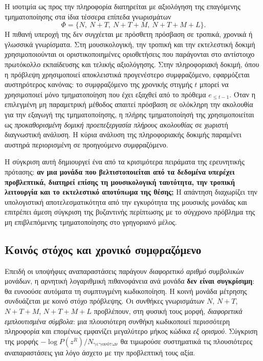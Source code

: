 \documentclass[11pt,a4paper]{article}
\begin{document}
Η ισοτιμία ως προς την πληροφορία διατηρείται με αξιολόγηση της επαγόμενης τμηματοποίησης στα ίδια τέσσερα επίπεδα γνωρισμάτων
\[
\Phi=\{N,\ N{+}T,\ N{+}T{+}M,\ N{+}T{+}M{+}L\}.
\]
Η πιθανή υπεροχή της δεν συγχέεται με πρόσθετη πρόσβαση σε τροπικά, χρονικά ή γλωσσικά γνωρίσματα. Στη μουσικολογική, την τροπική και την εκτελεστική δοκιμή χρησιμοποιούνται οι οριστικοποιημένες οριοθετήσεις που παράγονται στο αντίστοιχο πρωτόκολλο εκπαίδευσης και τελικής αξιολόγησης. Στην πληροφοριακή δοκιμή, όπου η πρόβλεψη χρησιμοποιεί αποκλειστικά προγενέστερο συμφραζόμενο, εφαρμόζεται αυστηρότερος κανόνας: το συμφραζόμενο της χρονικής στιγμής \(t\) μπορεί να χρησιμοποιεί μόνο τμηματοποίηση που έχει εξαχθεί από το πρόθεμα \(e_{\leq t-1}\). Όταν η επιλεγμένη μη παραμετρική μέθοδος απαιτεί πρόσβαση σε ολόκληρη την ακολουθία για την εξαγωγή της τμηματοποίησης, η πλήρης τμηματοποίησή της χρησιμοποιείται ως \emph{προκαθορισμένη δομική προεπεξεργασία πλήρους ακολουθίας} σε χωριστή διαγνωστική ανάλυση. Η κύρια ανάλυση της πληροφοριακής δοκιμής παραμένει αυστηρά περιορισμένη σε προηγούμενο συμφραζόμενο.

Η σύγκριση αυτή δημιουργεί ένα από τα κρισιμότερα πειράματα της ερευνητικής πρότασης: \textbf{αν μια μονάδα που βελτιστοποιείται από τα δεδομένα υπερέχει προβλεπτικά, διατηρεί επίσης τη μουσικολογική ταυτότητα, την τροπική λειτουργία και το εκτελεστικό αποτύπωμα της θέσης;} Η απάντηση διαχωρίζει την υπολογιστική αποτελεσματικότητα από την εγκυρότητα της μουσικής μονάδας και επιτρέπει άμεση σύγκριση της βυζαντινής περίπτωσης με το σύγχρονο πρόβλημα της μη επιβλεπόμενης τμηματοποίησης στο γρηγοριανό μέλος.

\subsection{Κοινός στόχος και χρονικό συμφραζόμενο}\label{app:repr-common-target}

Επειδή οι υποψήφιες αναπαραστάσεις παράγουν \emph{διαφορετικό αριθμό} συμβολικών μονάδων, η αρνητική λογαριθμική πιθανοφάνεια ανά μονάδα \textbf{δεν είναι συγκρίσιμη}: θα ευνοούσε αυτόματα τη συμπτυγμένη κωδικοποίηση. Η κοινή μονάδα μέτρησης συνδυάζεται με κοινό στόχο πρόβλεψης. Οι συνθήκες γνωρισμάτων \(N\), \(N{+}T\), \(N{+}T{+}M\), \(N{+}T{+}M{+}L\) προβλέπουν, στη φυσική τους μορφή, \emph{διαφορετικά εμπλουτισμένα σύμβολα}: μια πλουσιότερη συνθήκη κωδικοποιεί περισσότερη πληροφορία και επομένως εμφανίζει μεγαλύτερο μήκος κώδικα \emph{εξ ορισμού}. Σύγκριση της μορφής \(-\log P(z^R)/N_{\text{γεγονότων}}\) θα τιμωρούσε συστηματικά τις πλουσιότερες αναπαραστάσεις για λόγο άσχετο με την προβλεπτική τους αξία.
\end{document}
